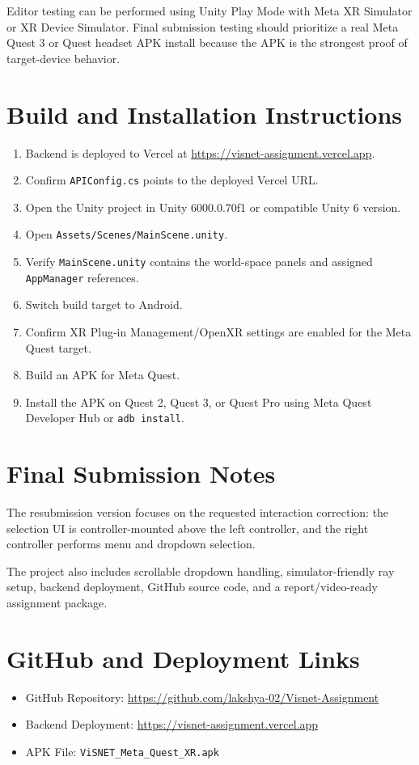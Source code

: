 \documentclass[11pt,a4paper]{article}
\begin{document}
Editor testing can be performed using Unity Play Mode with Meta XR Simulator or XR Device Simulator. Final submission testing should prioritize a real Meta Quest 3 or Quest headset APK install because the APK is the strongest proof of target-device behavior.

\section{Build and Installation Instructions}
\begin{enumerate}
    \item Backend is deployed to Vercel at \url{https://visnet-assignment.vercel.app}.
    \item Confirm \texttt{APIConfig.cs} points to the deployed Vercel URL.
    \item Open the Unity project in Unity 6000.0.70f1 or compatible Unity 6 version.
    \item Open \texttt{Assets/Scenes/MainScene.unity}.
    \item Verify \texttt{MainScene.unity} contains the world-space panels and assigned \texttt{AppManager} references.
    \item Switch build target to Android.
    \item Confirm XR Plug-in Management/OpenXR settings are enabled for the Meta Quest target.
    \item Build an APK for Meta Quest.
    \item Install the APK on Quest 2, Quest 3, or Quest Pro using Meta Quest Developer Hub or \texttt{adb install}.
\end{enumerate}

\section{Final Submission Notes}
The resubmission version focuses on the requested interaction correction: the selection UI is controller-mounted above the left controller, and the right controller performs menu and dropdown selection.

The project also includes scrollable dropdown handling, simulator-friendly ray setup, backend deployment, GitHub source code, and a report/video-ready assignment package.

\section{GitHub and Deployment Links}
\begin{itemize}
    \item GitHub Repository: \url{https://github.com/lakshya-02/Visnet-Assignment}
    \item Backend Deployment: \url{https://visnet-assignment.vercel.app}
    \item APK File: \texttt{ViSNET\_Meta\_Quest\_XR.apk}
\end{itemize}
\end{document}
